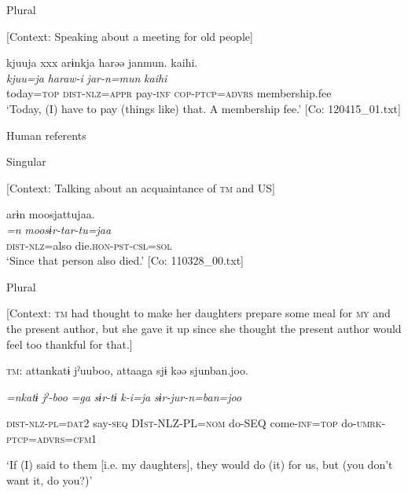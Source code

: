  \ex \label{ex:5:b} Plural

    [Context: Speaking about a meeting for old people]

\glll  kjuuja  xxx  arɨnkja  harəə  janmun.   {\textbar}kaihi{\textbar}.\\
\textit{kjuu=ja}    \textit{}  \textit{haraw-i}  \textit{jar-n=mun}   \textit{kaihi}\\
today=\textsc{top}    \textsc{dist}-\textsc{nlz}=\textsc{appr}  pay-\textsc{inf}  \textsc{cop}-\textsc{ptcp}=\textsc{advrs}   membership.fee\\
\glt ‘Today, (I) have to pay (things like) that. A membership fee.’ [Co: 120415\_01.txt]

  Human referents

 \ex \label{ex:5:c} Singular

    [Context: Talking about an acquaintance of \textsc{tm} and US]

\glll  arɨn  moosjattujaa.\\
\textit{=n}  \textit{moosɨr-tar-tu=jaa}\\
\textsc{dist}-\textsc{nlz}=also  die.\textsc{hon}-\textsc{pst}-\textsc{csl}=\textsc{sol}\\
\glt ‘Since that person also died.’ [Co: 110328\_00.txt]

  \ex \label{ex:5:d}  Plural

    [Context: \textsc{tm} had thought to make her daughters prepare some meal for \textsc{my} and the present author, but she gave it up since she thought the present author would feel too thankful for that.]

    \textsc{tm}:  attankatɨ  jˀuuboo,  attaaga  sjɨ   kəə  sjunban.joo.
                                                                                     
    \textit{=nkatɨ}  \textit{jˀ-boo}  \textit{=ga}  \textit{sɨr-tɨ}  \textit{k-i=ja}  \textit{sɨr-jur-n=ban=joo}
                                                                                     
    \textsc{dist}-\textsc{nlz}-\textsc{pl}=\textsc{dat}2  say-\textsc{seq}  DI\textsc{st}-NLZ-PL=\textsc{nom}  do-SEQ  come-\textsc{inf}=\textsc{top}  do-\textsc{umrk}-\textsc{ptcp}=\textsc{advrs}=\textsc{cfm}1

    ‘If (I) said to them [i.e. my daughters], they would do (it) for us, but (you don’t want it, do you?)’

